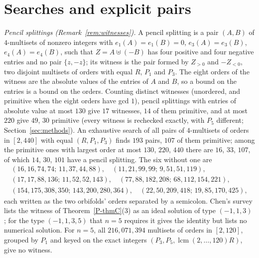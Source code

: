 \documentclass[pdflatex,sn-mathphys-num]{sn-jnl}
\newcommand{\pref}[1]{\ref*{P-#1}}%
\theoremstyle{thmstyleone}%
\theoremstyle{thmstylethree}%
\begin{document}
\maketitle

\section{Searches and explicit pairs}\label{sec:searches}

\emph{Pencil splittings (Remark~\ref{rem:witnesses}).} A pencil splitting is a pair $(A,B)$ of $4$-multisets of nonzero integers with $e_1(A)=e_1(B)=0$, $e_3(A)=e_3(B)$, $e_4(A)=e_4(B)$, such that $Z=A\uplus(-B)$ has four positive and four negative entries and no pair $\{z,-z\}$; its witness is the pair formed by $Z_{>0}$ and $-Z_{<0}$, two disjoint multisets of orders with equal $R$, $P_1$ and $P_3$. The eight orders of the witness are the absolute values of the entries of $A$ and $B$, so a bound on the entries is a bound on the orders. Counting distinct witnesses (unordered, and primitive when the eight orders have gcd $1$), pencil splittings with entries of absolute value at most $130$ give $17$ witnesses, $14$ of them primitive, and at most $220$ give $49$, $30$ primitive (every witness is rechecked exactly, with $P_5$ different; Section~\ref{sec:methods}). An exhaustive search of all pairs of $4$-multisets of orders in $[2,440]$ with equal $(R,P_1,P_3)$ finds $193$ pairs, $107$ of them primitive; among the primitive ones with largest order at most $130$, $220$, $440$ there are $16$, $33$, $107$, of which $14$, $30$, $101$ have a pencil splitting. The six without one are
\[
\begin{gathered}
(16,16,74,74;\,11,37,44,88),\quad(11,21,99,99;\,9,51,51,119),\\
(17,17,88,136;\,11,52,52,143),\quad(77,88,182,208;\,68,112,154,221),\\
(154,175,308,350;\,143,200,280,364),\quad(22,50,209,418;\,19,85,170,425),
\end{gathered}
\]
each written as the two orbifolds' orders separated by a semicolon. Chen's survey lists the witness of Theorem~\pref{thmC}(3) as an ideal solution of type $(-1,1,3)$ \cite[A.685]{chen2025survey}; for the type $(-1,1,3,5)$ that $n=5$ requires it gives the identity \cite[(3.33)]{chen2025survey} but lists no numerical solution. For $n=5$, all $216{,}071{,}394$ multisets of orders in $[2,120]$, grouped by $P_1$ and keyed on the exact integers $(P_3,P_5,\operatorname{lcm}(2,\dots,120)R)$, give no witness.
\end{document}

